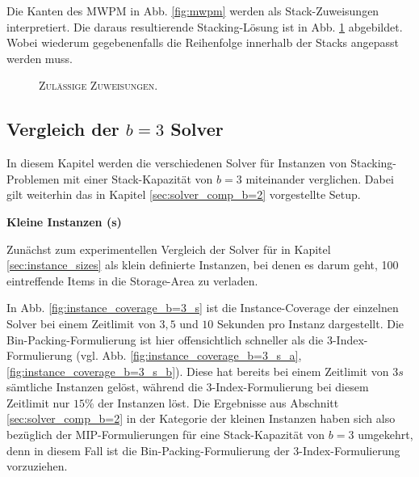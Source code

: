 \pagebreak

Die Kanten des \textsc{MWPM} in Abb. \ref{fig:mwpm} werden als Stack-Zuweisungen interpretiert.
Die daraus resultierende Stacking-Lösung ist in Abb. \ref{fig:valid_solution} abgebildet. Wobei wiederum gegebenenfalls die Reihenfolge
innerhalb der Stacks angepasst werden muss.

\begin{figure}[H]
  \centering
    \caption{\textsc{Zulässige Zuweisungen.}}
    \label{fig:valid_solution}
\end{figure}

\subsection{Vergleich der $b = 3$ Solver}
\label{sec:solver_comp_b=3}

In diesem Kapitel werden die verschiedenen Solver für Instanzen von Stacking-Problemen mit einer Stack-Kapazität
von $b = 3$ miteinander verglichen. Dabei gilt weiterhin das in Kapitel \ref{sec:solver_comp_b=2} vorgestellte Setup.

\textbf{Kleine Instanzen (s)}

Zunächst zum experimentellen Vergleich der Solver für in Kapitel \ref{sec:instance_sizes} als klein definierte
Instanzen, bei denen es darum geht, 100 eintreffende Items in die Storage-Area zu verladen.

In Abb. \ref{fig:instance_coverage_b=3_s} ist die Instance-Coverage der einzelnen Solver bei einem Zeitlimit von $3, 5$
und $10$ Sekunden pro Instanz dargestellt. Die Bin-Packing-Formulierung ist hier offensichtlich schneller als die 3-Index-Formulierung
(vgl. Abb. \ref{fig:instance_coverage_b=3_s_a}, \ref{fig:instance_coverage_b=3_s_b}).
Diese hat bereits bei einem Zeitlimit von $3s$ sämtliche Instanzen gelöst, während die 3-Index-Formulierung
bei diesem Zeitlimit nur $15 \%$ der Instanzen löst. Die Ergebnisse aus Abschnitt \ref{sec:solver_comp_b=2} in der Kategorie der kleinen
Instanzen haben sich also bezüglich der MIP-Formulierungen für eine Stack-Kapazität von $b = 3$ umgekehrt, denn in diesem Fall
ist die Bin-Packing-Formulierung der 3-Index-Formulierung vorzuziehen.

